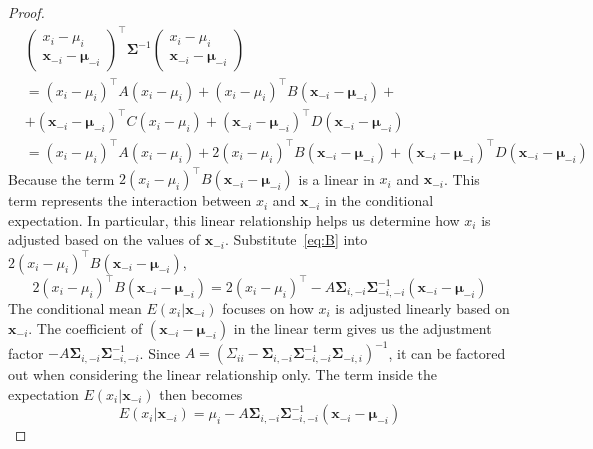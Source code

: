 \begin{proof}
\begin{align*}
        &\begin{pmatrix} x_i - \mu_i \\ \mathbf{x}_{-i} - \boldsymbol{\mu}_{-i} \end{pmatrix}^{\top} \boldsymbol{\Sigma}^{-1} \begin{pmatrix} x_i - \mu_i \\ \mathbf{x}_{-i} - \boldsymbol{\mu}_{-i} \end{pmatrix} \\
        &= (x_i - \mu_i)^{\top} A (x_i - \mu_i) + (x_i - \mu_i)^{\top} B (\mathbf{x}_{-i} - \boldsymbol{\mu}_{-i}) + \\
        &+(\mathbf{x}_{-i} - \boldsymbol{\mu}_{-i})^{\top} C (x_i - \mu_i) + (\mathbf{x}_{-i} - \boldsymbol{\mu}_{-i})^{\top} D (\mathbf{x}_{-i} - \boldsymbol{\mu}_{-i}) \\
        &= (x_i - \mu_i)^{\top} A (x_i - \mu_i) + 2 (x_i - \mu_i)^{\top} B (\mathbf{x}_{-i} - \boldsymbol{\mu}_{-i}) + (\mathbf{x}_{-i} - \boldsymbol{\mu}_{-i})^{\top} D (\mathbf{x}_{-i} - \boldsymbol{\mu}_{-i})
    \end{align*}
    Because the term $2(x_i - \mu_i)^{\top} B (\mathbf{x}_{-i} - \boldsymbol{\mu}_{-i})$ is a linear in $x_i$ and $\mathbf{x}_{-i}$. 
    This term represents the interaction between $x_i$ and $\mathbf{x}_{-i}$ in the conditional expectation. 
    In particular, this linear relationship helps us determine how $x_i$ is adjusted based on the values of $\mathbf{x}_{-i}$.
    Substitute~\ref{eq:B} into $2(x_i - \mu_i)^{\top} B (\mathbf{x}_{-i} - \boldsymbol{\mu}_{-i})$, 
    \begin{equation} 
        2(x_i - \mu_i)^{\top} B (\mathbf{x}_{-i} - \boldsymbol{\mu}_{-i})=2(x_i - \mu_i)^{\top} -A \boldsymbol{\Sigma}_{i,-i} \boldsymbol{\Sigma}_{-i,-i}^{-1} (\mathbf{x}_{-i} - \boldsymbol{\mu}_{-i})
    \end{equation}
    The conditional mean $E(x_i|\mathbf{x}_{-i})$ focuses on how $x_i$ is adjusted linearly based on $\mathbf{x}_{-i}$. 
    The coefficient of $(\mathbf{x}_{-i} - \boldsymbol{\mu}_{-i})$ in the linear term gives us the adjustment factor $-A \boldsymbol{\Sigma}_{i,-i} \boldsymbol{\Sigma}_{-i,-i}^{-1}$. 
    Since $ A=(\Sigma_{ii} - \boldsymbol{\Sigma}_{i,-i} \boldsymbol{\Sigma}_{-i,-i}^{-1} \boldsymbol{\Sigma}_{-i,i})^{-1}$, it can be factored out when considering the linear relationship only.
    The term inside the expectation $E(x_i|\mathbf{x}_{-i})$ then becomes 
    \begin{equation} 
        E(x_i|\mathbf{x}_{-i})=\mu_i-A\boldsymbol{\Sigma}_{i,-i}\boldsymbol{\Sigma}_{-i, -i}^{-1}(\mathbf{x}_{-i}-\boldsymbol{\mu}_{-i})

\end{equation}
\end{proof}
